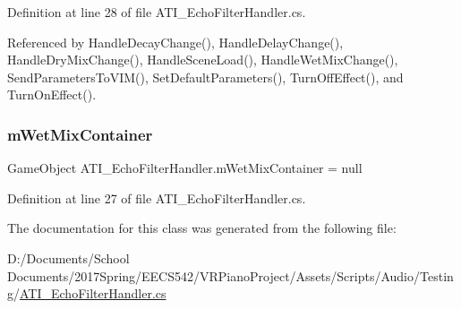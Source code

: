 Definition at line 28 of file A\+T\+I\+\_\+\+Echo\+Filter\+Handler.\+cs.



Referenced by Handle\+Decay\+Change(), Handle\+Delay\+Change(), Handle\+Dry\+Mix\+Change(), Handle\+Scene\+Load(), Handle\+Wet\+Mix\+Change(), Send\+Parameters\+To\+V\+I\+M(), Set\+Default\+Parameters(), Turn\+Off\+Effect(), and Turn\+On\+Effect().

\mbox{\label{class_a_t_i___echo_filter_handler_a571d860b69c4ca4105355d0f1447feb2}} 
\subsubsection{\texorpdfstring{m\+Wet\+Mix\+Container}{mWetMixContainer}}
{\footnotesize\ttfamily Game\+Object A\+T\+I\+\_\+\+Echo\+Filter\+Handler.\+m\+Wet\+Mix\+Container = null\hspace{0.3cm}{\ttfamily [private]}}



Definition at line 27 of file A\+T\+I\+\_\+\+Echo\+Filter\+Handler.\+cs.



The documentation for this class was generated from the following file\+:\begin{DoxyCompactItemize}
\item 
D\+:/\+Documents/\+School Documents/2017\+Spring/\+E\+E\+C\+S542/\+V\+R\+Piano\+Project/\+Assets/\+Scripts/\+Audio/\+Testing/\hyperlink{_a_t_i___echo_filter_handler_8cs}{A\+T\+I\+\_\+\+Echo\+Filter\+Handler.\+cs}\end{DoxyCompactItemize}
